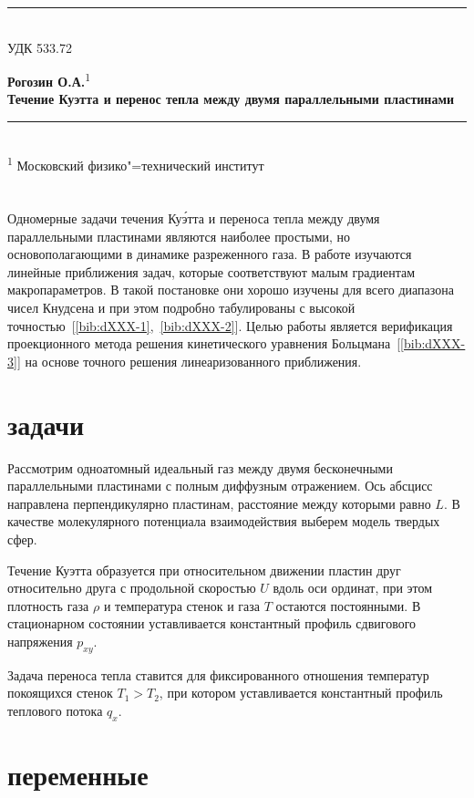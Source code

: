\documentclass[english,russian,a4paper,12pt]{article}
\newcommand{\HRule}{\rule{\linewidth}{0.5mm}}
\begin{document}
\noindent\HRule\\
 УДК 533.72
\begin{center}
	\large\textbf{Рогозин О.А.}\textsuperscript{1}\\
	\bf\huge Течение Куэтта и перенос тепла между двумя параллельными пластинами
\end{center}
\HRule\\
\textsuperscript{1} Московский физико"=технический институт


\section*{}

Одномерные задачи течения Ку\'{э}тта и переноса тепла между двумя параллельными пластинами являются наиболее простыми,
но основополагающими в динамике разреженного газа. В работе изучаются линейные приближения задач,
которые соответствуют малым градиентам макропараметров. В такой постановке они хорошо изучены
для всего диапазона чисел Кнудсена и при этом подробно табулированы с высокой точностью~[\ref{bib:dXXX-1},~\ref{bib:dXXX-2}].
Целью работы является верификация проекционного метода решения кинетического уравнения Больцмана~[\ref{bib:dXXX-3}]
на основе точного решения линеаризованного приближения.

\section*{ задачи}

Рассмотрим одноатомный идеальный газ между двумя бесконечными параллельными пластинами с полным диффузным отражением.
Ось абсцисс направлена перпендикулярно пластинам, расстояние между которыми равно \(L\).
В качестве молекулярного потенциала взаимодействия выберем модель твердых сфер.

Течение Куэтта образуется при  относительном движении пластин друг относительно друга с продольной скоростью \(U\)
вдоль оси ординат, при этом плотность газа \(\rho\) и температура стенок и газа \(T\) остаются постоянными.
В стационарном состоянии уставливается константный профиль сдвигового напряжения \(p_{xy}\).

Задача переноса тепла ставится для фиксированного отношения температур покоящихся стенок \(T_1>T_2\),
при котором уставливается константный профиль теплового потока \(q_x\).

\section*{ переменные}
\end{document}
